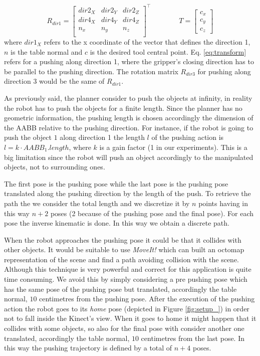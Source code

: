 \begin{equation}
R_{dir1} =
\begin{bmatrix}
dir2_X & dir2_Y & dir2_Z \\
dir4_X & dir4_Y & dir4_Z \\
n_x & n_y & n_z \\
\end{bmatrix}^{\top}
\qquad \qquad
T=
\begin{bmatrix}
c_x \\ c_y \\ c_z
\end{bmatrix}
\label{eq:transform}
\end{equation}
where $dir1_X$ refers to the x coordinate of the vector that defines the direction 1, $n$ is the table normal and $c$ is the desired tool central point. Eq. \ref{eq:transform} refers for a pushing along direction 1, where the gripper's closing direction has to be parallel to the pushing direction. The rotation matrix $R_{dir3}$ for pushing along direction 3 would be the same of $R_{dir1}$. 

As previously said, the planner consider to push the objects at infinity, in reality the robot has to push the objects for a finite length. Since the planner has no geometric information, the pushing length is chosen accordingly the dimension of the AABB relative to the pushing direction. For instance, if the robot is going to push the object $1$ along direction 1 the length $l$ of the pushing action is $l=k \cdot AABB_1.length$, where $k$ is a gain factor (1 in our experiments). This is a big limitation since the robot will push an object accordingly to the manipulated objects, not to surrounding ones. 

The first pose is the pushing pose while the last pose is the pushing pose translated along the pushing direction by the length of the push. To retrieve the path the we consider the total length and we discretize it by $n$ points having in this way $n+2$ poses (2 because of the pushing pose and the final pose). For each pose the inverse kinematic is done. In this way we obtain a discrete path. 

When the robot approaches the pushing pose it could be that it collides with other objects. It would be suitable to use \textit{MoveIt!} which can built an octomap representation of the scene and find a path avoiding collision with the scene. Although this technique is very powerful and correct for this application is quite time consuming. We avoid this by simply considering a pre pushing pose which has the same pose of the pushing pose but translated, accordingly the table normal, $10$ centimetres from the pushing pose. 
After the execution of the pushing action the robot goes to its \textit{home} pose (depicted in Figure \ref{fig:setup_}) in order not to fall inside the Kinect's view. When it goes to home it might happen that it collides with some objects, so also for the final pose with consider another one translated, accordingly the table normal, $10$ centimetres from the last pose. 
In this way the pushing trajectory is defined by a total of $n+4$ poses. 


